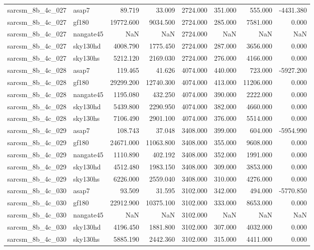 \begin{tabular}{llrrrrrr}
sarcsm\_8b\_4c\_027 & asap7 & 89.719 & 33.009 & 2724.000 & 351.000 & 555.000 & -4431.380 \\
sarcsm\_8b\_4c\_027 & gf180 & 19772.600 & 9034.500 & 2724.000 & 285.000 & 7581.000 & 0.000 \\
sarcsm\_8b\_4c\_027 & nangate45 & NaN & NaN & 2724.000 & NaN & NaN & NaN \\
sarcsm\_8b\_4c\_027 & sky130hd & 4008.790 & 1775.450 & 2724.000 & 287.000 & 3656.000 & 0.000 \\
sarcsm\_8b\_4c\_027 & sky130hs & 5212.120 & 2169.030 & 2724.000 & 276.000 & 4166.000 & 0.000 \\
sarcsm\_8b\_4c\_028 & asap7 & 119.465 & 41.626 & 4074.000 & 440.000 & 723.000 & -5927.200 \\
sarcsm\_8b\_4c\_028 & gf180 & 29299.200 & 12740.300 & 4074.000 & 413.000 & 11206.000 & 0.000 \\
sarcsm\_8b\_4c\_028 & nangate45 & 1195.080 & 432.250 & 4074.000 & 390.000 & 2222.000 & 0.000 \\
sarcsm\_8b\_4c\_028 & sky130hd & 5439.800 & 2290.950 & 4074.000 & 382.000 & 4660.000 & 0.000 \\
sarcsm\_8b\_4c\_028 & sky130hs & 7106.490 & 2901.100 & 4074.000 & 376.000 & 5514.000 & 0.000 \\
sarcsm\_8b\_4c\_029 & asap7 & 108.743 & 37.048 & 3408.000 & 399.000 & 604.000 & -5954.990 \\
sarcsm\_8b\_4c\_029 & gf180 & 24671.000 & 11063.800 & 3408.000 & 355.000 & 9608.000 & 0.000 \\
sarcsm\_8b\_4c\_029 & nangate45 & 1110.890 & 402.192 & 3408.000 & 352.000 & 1991.000 & 0.000 \\
sarcsm\_8b\_4c\_029 & sky130hd & 4512.480 & 1983.150 & 3408.000 & 309.000 & 3853.000 & 0.000 \\
sarcsm\_8b\_4c\_029 & sky130hs & 6226.000 & 2559.040 & 3408.000 & 310.000 & 4276.000 & 0.000 \\
sarcsm\_8b\_4c\_030 & asap7 & 93.509 & 31.595 & 3102.000 & 342.000 & 494.000 & -5770.850 \\
sarcsm\_8b\_4c\_030 & gf180 & 22912.900 & 10375.100 & 3102.000 & 333.000 & 8653.000 & 0.000 \\
sarcsm\_8b\_4c\_030 & nangate45 & NaN & NaN & 3102.000 & NaN & NaN & NaN \\
sarcsm\_8b\_4c\_030 & sky130hd & 4196.450 & 1881.800 & 3102.000 & 307.000 & 4032.000 & 0.000 \\
sarcsm\_8b\_4c\_030 & sky130hs & 5885.190 & 2442.360 & 3102.000 & 315.000 & 4411.000 & 0.000 \\

\end{tabular}
